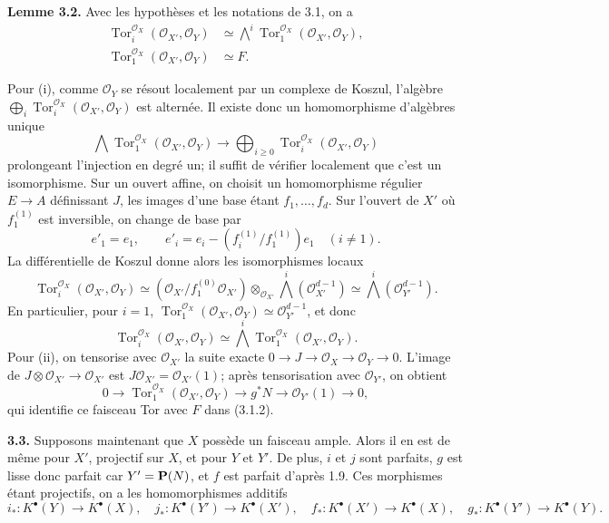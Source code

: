 \documentclass[11pt]{article}
\newcommand{\Tor}{\operatorname{Tor}}
\providecommand{\Tor}{\operatorname{Tor}}
\providecommand{\cO}{\mathcal O}
\begin{document}
\textbf{Lemme 3.2.} Avec les hypothèses et les notations de 3.1, on a
\begin{align}
\Tor_i^{\cO_X}(\cO_{X'},\cO_Y)&\simeq
\bigwedge^i\Tor_1^{\cO_X}(\cO_{X'},\cO_Y),\tag{3.2.i}\\
\Tor_1^{\cO_X}(\cO_{X'},\cO_Y)&\simeq F.\tag{3.2.ii}
\end{align}

Pour (i), comme \(\cO_Y\) se résout localement par un complexe de Koszul, l'algèbre \(\bigoplus_i\Tor_i^{\cO_X}(\cO_{X'},\cO_Y)\) est alternée. Il existe donc un homomorphisme d'algèbres unique
\begin{equation}\tag{3.2.1}
\bigwedge \Tor_1^{\cO_X}(\cO_{X'},\cO_Y)
\longrightarrow
\bigoplus_{i\ge0}\Tor_i^{\cO_X}(\cO_{X'},\cO_Y)
\end{equation}
prolongeant l'injection en degré un; il suffit de vérifier localement que c'est un isomorphisme. Sur un ouvert affine, on choisit un homomorphisme régulier \(E\to A\) définissant \(J\), les images d'une base étant \(f_1,\ldots,f_d\). Sur l'ouvert de \(X'\) où \(f_1^{(1)}\) est inversible, on change de base par
\[
e'_1=e_1,
\qquad
e'_i=e_i-(f_i^{(1)}/f_1^{(1)})e_1\quad(i\ne1).
\]
La différentielle de Koszul donne alors les isomorphismes locaux
\begin{equation}\tag{3.2.2}
\Tor_i^{\cO_X}(\cO_{X'},\cO_Y)
\simeq
(\cO_{X'}/f_1^{(0)}\cO_{X'})\otimes_{\cO_{X'}}
\bigwedge^i(\cO_{X'}^{d-1})
\simeq
\bigwedge^i(\cO_{Y'}^{d-1}).
\end{equation}
En particulier, pour \(i=1\), \(\Tor_1^{\cO_X}(\cO_{X'},\cO_Y)\simeq \cO_{Y'}^{d-1}\), et donc
\begin{equation}\tag{3.2.3}
\Tor_i^{\cO_X}(\cO_{X'},\cO_Y)
\simeq
\bigwedge^i\Tor_1^{\cO_X}(\cO_{X'},\cO_Y).
\end{equation}
Pour (ii), on tensorise avec \(\cO_{X'}\) la suite exacte \(0\to J\to\cO_X\to\cO_Y\to0\). L'image de \(J\otimes\cO_{X'}\to\cO_{X'}\) est \(J\cO_{X'}=\cO_{X'}(1)\); après tensorisation avec \(\cO_{Y'}\), on obtient
\begin{equation}\tag{3.2.4}
0\to \Tor_1^{\cO_X}(\cO_{X'},\cO_Y)\to g^*N\to\cO_{Y'}(1)
\to0,
\end{equation}
qui identifie ce faisceau Tor avec \(F\) dans (3.1.2).

\textbf{3.3.} Supposons maintenant que \(X\) possède un faisceau ample. Alors il en est de même pour \(X'\), projectif sur \(X\), et pour \(Y\) et \(Y'\). De plus, \(i\) et \(j\) sont parfaits, \(g\) est lisse donc parfait car \(Y'=\mathbf P(N)\), et \(f\) est parfait d'après 1.9. Ces morphismes étant projectifs, on a les homomorphismes additifs
\[
i_*:K^\bullet(Y)\to K^\bullet(X),\quad
j_*:K^\bullet(Y')\to K^\bullet(X'),\quad
f_*:K^\bullet(X')\to K^\bullet(X),\quad
g_*:K^\bullet(Y')\to K^\bullet(Y).
\]
\end{document}

